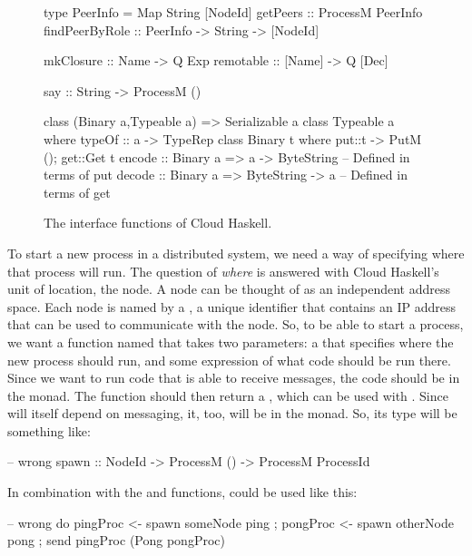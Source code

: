 \documentclass[preprint]{sigplanconf}
\begin{document}
\begin{figure}[t!]
\begin{code}
type PeerInfo = Map String [NodeId]
getPeers       :: ProcessM PeerInfo
findPeerByRole :: PeerInfo -> String -> [NodeId]
\end{code}

\begin{code}
mkClosure :: Name   -> Q Exp
remotable :: [Name] -> Q [Dec]
\end{code}

\begin{code}
say :: String -> ProcessM ()
\end{code}

\begin{code}
class (Binary a,Typeable a) => Serializable a
class Typeable a where typeOf :: a -> TypeRep
class Binary t where {put::t -> PutM (); get::Get t}
encode :: Binary a => a -> ByteString
  -- Defined in terms of put
decode :: Binary a => ByteString -> a
  -- Defined in terms of get
\end{code}
\caption{The interface functions of Cloud Haskell.%
\label{fig:api}}
\end{figure}


To start a new process in a distributed system, we need a way of specifying where that process will run. 
The question of {\em where} is answered with Cloud Haskell's unit of location, the node. 
A node can be thought of as an independent address space.
Each node is named by a , a unique identifier that contains an IP address that can be used to communicate with the node. 
So, to be able to start a process, we want a function named  that takes two parameters: 
a  that specifies where the new process should run, and some expression of what code should be run there. 
Since we want to run code that is able to receive messages, the code should be in the  monad. 
The  function should then return a , which can be used with .  
Since  will itself depend on messaging, it, too, will be in the  monad. 
So, its type will be something like:

\begin{code}
-- wrong
spawn :: NodeId -> ProcessM () -> ProcessM ProcessId
\end{code}

In combination with the  and  functions,  could be used like this:

\needspace{4ex}
\begin{code}
-- wrong
do { pingProc <- spawn someNode ping
   ; pongProc <- spawn otherNode pong
   ; send pingProc (Pong pongProc) }
\end{code}
\end{document}
